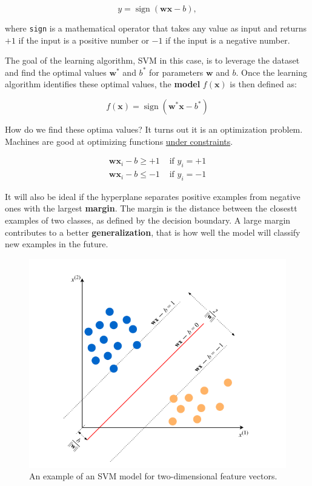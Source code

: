 $$
	y=\operatorname{sign}(\mathbf{w} \mathbf{x}-b),
$$

where \verb*|sign| is a mathematical operator that takes any value as input and returns $+1$ if the input is a positive number or $-1$ if the input is a negative number.

The goal of the learning algorithm, SVM in this case, is to leverage the dataset and find the optimal values \(\mathbf{w}^{*}\) and $b^{*}$ for parameters $\mathbf{w}$ and $b$. Once the learning algorithm identifies these optimal values, the \textbf{model} $f(\mathbf{x})$ is then defined as:

\begin{equation*}
	f(\mathbf{x})=\operatorname{sign}\left(\mathbf{w}^* \mathbf{x}-b^*\right)
\end{equation*}


How do we find these optima values? It turns out it is an optimization problem. Machines are good at optimizing functions \underline{under constraints}.

$$
	\begin{array}{ll}
		\mathbf{w} \mathbf{x}_{i}-b \geq+1 & \text { if } y_{i}=+1 \\
		\mathbf{w} \mathbf{x}_{i}-b \leq-1 & \text { if } y_{i}=-1
	\end{array}
$$

It will also be ideal if the hyperplane separates positive examples from negative ones with the largest \textbf{margin}. The margin is the distance between the closestt examples of two classes, as defined by the decision boundary. A large margin contributes to a better \textbf{generalization}, that is how well the model will classify new examples in the future.

\begin{figure}[H]
	\centering
	\includegraphics[width=0.7\linewidth]{imgs/introduction/intro_1}
	\caption{An example of an SVM model for two-dimensional feature vectors.}
	\label{fig:intro1}
\end{figure}

